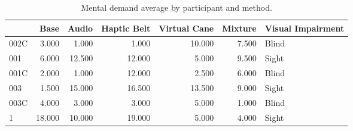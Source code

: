 
\begin{table}[!htb]
\centering
\caption{Mental demand average by participant and method.}
\label{tab:md_average}
\begin{tabular}{lrrrrrl}
\toprule
{} &   Base &  Audio &  Haptic Belt &  Virtual Cane &  Mixture & Visual Impairment \\
\midrule
002C &  3.000 &  1.000 &        1.000 &        10.000 &    7.500 &             Blind \\
001  &  6.000 & 12.500 &       12.000 &         5.000 &    9.500 &             Sight \\
001C &  2.000 &  1.000 &       12.000 &         2.500 &    6.000 &             Blind \\
003  &  1.500 & 15.000 &       16.500 &        13.500 &    9.000 &             Sight \\
003C &  4.000 &  3.000 &        3.000 &         5.000 &    1.000 &             Blind \\
1    & 18.000 & 10.000 &       19.000 &         5.000 &    4.000 &             Sight \\
\bottomrule
\end{tabular}
\end{table}

